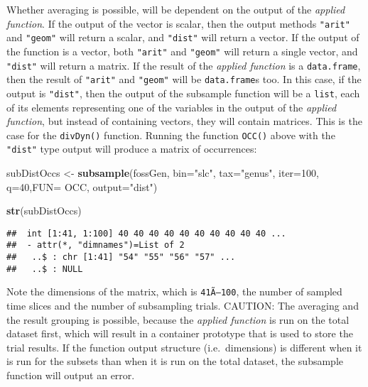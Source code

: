 \documentclass[]{article}
\newenvironment{Shaded}{\begin{snugshade}}{\end{snugshade}}
\newcommand{\DataTypeTok}[1]{\textcolor[rgb]{0.13,0.29,0.53}{#1}}
\newcommand{\DecValTok}[1]{\textcolor[rgb]{0.00,0.00,0.81}{#1}}
\newcommand{\KeywordTok}[1]{\textcolor[rgb]{0.13,0.29,0.53}{\textbf{#1}}}
\newcommand{\NormalTok}[1]{#1}
\newcommand{\StringTok}[1]{\textcolor[rgb]{0.31,0.60,0.02}{#1}}
\begin{document}
Whether averaging is possible, will be dependent on the output of the
\emph{applied function}. If the output of the vector is scalar, then the
output methods \texttt{"arit"} and \texttt{"geom"} will return a scalar,
and \texttt{"dist"} will return a vector. If the output of the function
is a vector, both \texttt{"arit"} and \texttt{"geom"} will return a
single vector, and \texttt{"dist"} will return a matrix. If the result
of the \emph{applied function} is a \texttt{data.frame}, then the result
of \texttt{"arit"} and \texttt{"geom"} will be \texttt{data.frame}s too.
In this case, if the output is \texttt{"dist"}, then the output of the
subsample function will be a \texttt{list}, each of its elements
representing one of the variables in the output of the \emph{applied
function}, but instead of containing vectors, they will contain
matrices. This is the case for the \texttt{divDyn()} function. Running
the function \texttt{OCC()} above with the \texttt{"dist"} type output
will produce a matrix of occurrences:

\begin{Shaded}
\begin{Highlighting}[]
\NormalTok{subDistOccs <-}\StringTok{ }\KeywordTok{subsample}\NormalTok{(fossGen, }\DataTypeTok{bin=}\StringTok{"slc"}\NormalTok{, }\DataTypeTok{tax=}\StringTok{"genus"}\NormalTok{, }
  \DataTypeTok{iter=}\DecValTok{100}\NormalTok{, }\DataTypeTok{q=}\DecValTok{40}\NormalTok{,}\DataTypeTok{FUN=}\NormalTok{ OCC, }\DataTypeTok{output=}\StringTok{"dist"}\NormalTok{)}
\end{Highlighting}
\end{Shaded}

\begin{Shaded}
\begin{Highlighting}[]
\KeywordTok{str}\NormalTok{(subDistOccs)}
\end{Highlighting}
\end{Shaded}

\begin{verbatim}
##  int [1:41, 1:100] 40 40 40 40 40 40 40 40 40 40 ...
##  - attr(*, "dimnames")=List of 2
##   ..$ : chr [1:41] "54" "55" "56" "57" ...
##   ..$ : NULL
\end{verbatim}

Note the dimensions of the matrix, which is \texttt{41Ã—100}, the number
of sampled time slices and the number of subsampling trials. CAUTION:
The averaging and the result grouping is possible, because the
\emph{applied function} is run on the total dataset first, which will
result in a container prototype that is used to store the trial results.
If the function output structure (i.e.~dimensions) is different when it
is run for the subsets than when it is run on the total dataset, the
subsample function will output an error.
\end{document}
